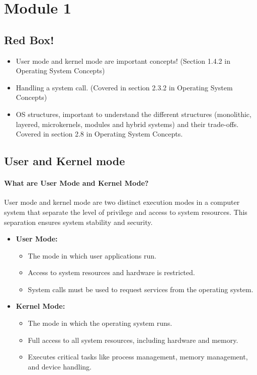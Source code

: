 \section{Module 1}

\subsection{Red Box!}
\begin{itemize}
    \item User mode and kernel mode are important concepts!
    (Section 1.4.2 in Operating System Concepts)
    \item Handling a system call. (Covered in section 2.3.2 in Operating System Concepts)
    \item OS structures, important to understand the different structures (monolithic, layered, microkernels, modules and hybrid systems) and their trade-offs. Covered in section 2.8 in Operating System Concepts.
\end{itemize}

\subsection{User and Kernel mode}

\paragraph{What are User Mode and Kernel Mode?}
User mode and kernel mode are two distinct execution modes in a computer system that separate the level of privilege and access to system resources. This separation ensures system stability and security.

\begin{itemize}
    \item \textbf{User Mode:}
    \begin{itemize}
        \item The mode in which user applications run.
        \item Access to system resources and hardware is restricted.
        \item System calls must be used to request services from the operating system.
    \end{itemize}
    
    \item \textbf{Kernel Mode:}
    \begin{itemize}
        \item The mode in which the operating system runs.
        \item Full access to all system resources, including hardware and memory.
        \item Executes critical tasks like process management, memory management, and device handling.
    \end{itemize}
\end{itemize}

